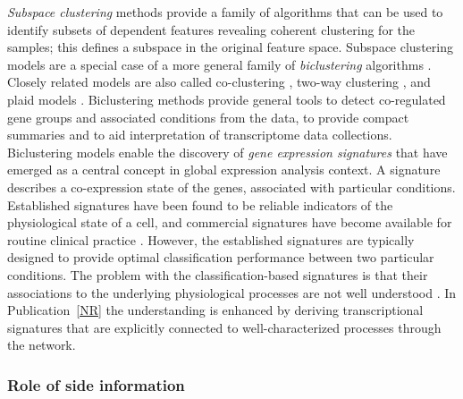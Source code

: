 {\it Subspace clustering} methods \citep{Parsons04} provide a family
of algorithms that can be used to identify subsets of dependent
features revealing coherent clustering for the samples; this defines a
subspace in the original feature space. Subspace clustering models are
a special case of a more general family of {\it biclustering}
algorithms \citep{Madeira04}. Closely related models are also called
co-clustering \citep{Cho04}, two-way clustering \citet{Getz00}, and
plaid models \citep{Lazzeroni02}. Biclustering methods provide general
tools to detect co-regulated gene groups and associated conditions
from the data, to provide compact summaries and to aid interpretation
of transcriptome data collections. Biclustering models enable the
discovery of {\it gene expression signatures} \citep{Hu06} that have
emerged as a central concept in global expression analysis context. A
signature describes a co-expression state of the genes, associated
with particular conditions. Established signatures have been found to
be reliable indicators of the physiological state of a cell, and
commercial signatures have become available for routine clinical
practice \citep{Nuyten08}. However, the established signatures are
typically designed to provide optimal classification performance
between two particular conditions. The problem with the
classification-based signatures is that their associations to the
underlying physiological processes are not well understood
\citep{Lucas09}. In Publication~\ref{NR} the understanding is enhanced
by deriving transcriptional signatures that are explicitly connected
to well-characterized processes through the network.

\subsubsection{Role of side information}

